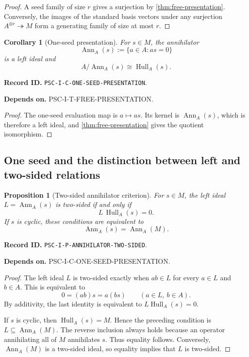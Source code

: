 \documentclass[11pt]{article}
\newtheorem{proposition}[proposition]{Proposition}
\newtheorem{corollary}[corollary]{Corollary}
\theoremstyle{definition}
\theoremstyle{remark}
\newcommand{\Hull}{\operatorname{Hull}}
\newcommand{\RecordID}[1]{\par\smallskip\noindent\begingroup\footnotesize\color{PSCGray}\raggedright\textbf{Record ID.} \nolinkurl{#1}.\par\endgroup}
\newcommand{\Depends}[1]{\par\noindent\begingroup\footnotesize\color{PSCGray}\raggedright\textbf{Depends on.} #1\par\endgroup}
\begin{document}
\begin{proof}
A seed family of size $r$ gives a surjection by \cref{thm:free-presentation}.  Conversely, the images of the standard basis vectors under any surjection $A^{\oplus r}\twoheadrightarrow M$ form a generating family of size at most $r$.
\end{proof}

\begin{corollary}[One-seed presentation]
\label{cor:one-seed-presentation}
For $s\in M$, the annihilator
\[
\operatorname{Ann}_A(s):=\{a\in A:as=0\}
\]
is a left ideal and
\[
\boxed{A/\operatorname{Ann}_A(s)\cong\Hull_A(s).}
\]
\end{corollary}
\RecordID{PSC-I-C-ONE-SEED-PRESENTATION}
\Depends{PSC-I-T-FREE-PRESENTATION.}

\begin{proof}
The one-seed evaluation map is $a\mapsto as$.  Its kernel is $\operatorname{Ann}_A(s)$, which is therefore a left ideal, and \cref{thm:free-presentation} gives the quotient isomorphism.
\end{proof}

\subsection{One seed and the distinction between left and two-sided relations}
\begin{proposition}[Two-sided annihilator criterion]
\label{prop:two-sided-annihilator}
For $s\in M$, the left ideal $L=\operatorname{Ann}_A(s)$ is two-sided if and only if
\[
L\,\Hull_A(s)=0.
\]
If $s$ is cyclic, these conditions are equivalent to
\[
\operatorname{Ann}_A(s)=\operatorname{Ann}_A(M).
\]
\end{proposition}
\RecordID{PSC-I-P-ANNIHILATOR-TWO-SIDED}
\Depends{PSC-I-C-ONE-SEED-PRESENTATION.}

\begin{proof}
The left ideal $L$ is two-sided exactly when $ab\in L$ for every $a\in L$ and $b\in A$.  This is equivalent to
\[
0=(ab)s=a(bs)
\qquad(a\in L,\ b\in A).
\]
By additivity, the last identity is equivalent to $L\Hull_A(s)=0$.

If $s$ is cyclic, then $\Hull_A(s)=M$.  Hence the preceding condition is $L\subseteq\operatorname{Ann}_A(M)$.  The reverse inclusion always holds because an operator annihilating all of $M$ annihilates $s$.  Thus equality follows.  Conversely, $\operatorname{Ann}_A(M)$ is a two-sided ideal, so equality implies that $L$ is two-sided.
\end{proof}
\end{document}
